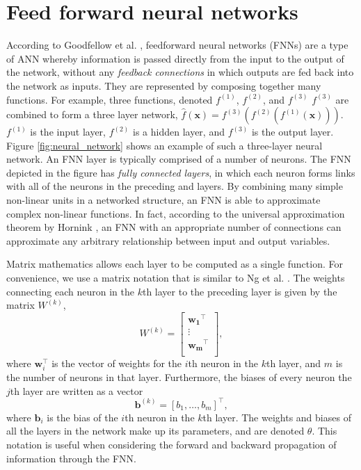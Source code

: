 \section{Feed forward neural networks}
\label{sec:fnn}

According to Goodfellow et al. \cite{Goodfellow2016}, feedforward neural networks (FNNs) are a type of ANN whereby information is passed directly from the input to the output of the network, without any \emph{feedback connections} in which outputs are fed back into the network as inputs.
They are represented by composing together many functions.
For example, three functions, denoted $f^{(1)}$, $f^{(2)}$, and $f^{(3)}$ $f^{(3)}$ are combined to form a three layer network, 
$\hat{f}(\mathbf{x}) = f^{(3)}( f^{(2)}( f^{(1)}(\mathbf{x}) ) )$. 
$f^{(1)}$ is the input layer, $f^{(2)}$ is a hidden layer, and $f^{(3)}$ is the output layer.
Figure \ref{fig:neural_network} shows an example of such a three-layer neural network.
An FNN layer is typically comprised of a number of neurons.
The FNN depicted in the figure has \emph{fully connected layers}, in which each neuron forms links with all of the neurons in the preceding and layers.
By combining many simple non-linear units in a networked structure, an FNN is able to approximate complex non-linear functions. 
In fact, according to the universal approximation theorem by Hornink \cite{Hornik1989}, an FNN with an appropriate number of connections can approximate any arbitrary relationship between input and output variables.

Matrix mathematics allows each layer to be computed as a single function.
For convenience, we use a matrix notation that is similar to Ng et al. \cite{Ng2019}.
The weights connecting each neuron in the $k$th layer to the preceding layer is given by the matrix $W^{(k)}$, 
\begin{equation}
    W^{(k)} = 
    \begin{bmatrix}
        \mathbf{w_{1}}^{\intercal}\\
        \vdots \\
        \mathbf{w_{m}}^\intercal \\
    \end{bmatrix}, 
\end{equation}
where $\mathbf{w}_{i}^{\intercal}$ is the vector of weights for the $i$th neuron in the $k$th layer, and $m$ is the number of neurons in that layer.
Furthermore, the biases of every neuron the $j$th layer are written as a vector
\begin{equation}
    \mathbf{b}^{(k)} = [ b_1, \ldots, b_m ]^\intercal,
\end{equation}
where $\mathbf{b}_{i}$ is the bias of the $i$th neuron in the $k$th layer.
The weights and biases of all the layers in the network make up its parameters, and are denoted $\theta$.
This notation is useful when considering the forward and backward propagation of information through the FNN.


